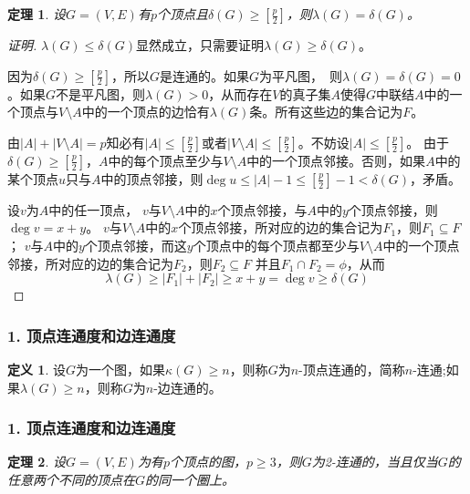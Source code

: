 \documentclass{beamer}
\newtheorem{Thm}{定理}[section]
\theoremstyle{definition}
\newtheorem{Def}{定义}[section]
\theoremstyle{example}
\begin{document}
\begin{CJK}{UTF8}{gbsn}
\begin{frame}
  \begin{Thm}
    设$G=(V,E)$有$p$个顶点且$\delta(G) \geq [ \frac{p}{2} ]$，则$\lambda(G) = \delta(G)$。
  \end{Thm}\small{\pause
  \begin{proof}[证明]
    \pause $\lambda(G) \leq \delta(G)$显然成立，\pause 只需要证明$\lambda(G) \geq \delta(G)$。

     

   \pause 因为$\delta(G) \geq [\frac{p}{2}]$，所以$G$是连通的。\pause 如果$G$为平凡图，　则$\lambda (G) = \delta(G) = 0$。如果$G$不是平凡图，则$\lambda(G) > 0$，从而存在$V$的真子集$A$使得$G$中联结$A$中的一个顶点与$V\setminus A$中的一个顶点的边恰有$\lambda(G)$条。\pause 所有这些边的集合记为$F$。

  \pause  由$|A| + |V\setminus A| = p$知必有$|A| \leq [\frac{p}{2}]$或者$|V\setminus A| \leq [\frac{p}{2}]$。\pause 不妨设$|A| \leq [\frac{p}{2}]$。 \pause 由于$\delta(G) \geq [\frac{p}{2}]$，$A$中的每个顶点至少与$V\setminus A$中的一个顶点邻接。\pause 否则，如果$A$中的某个顶点$u$只与$A$中的顶点邻接，则$\deg u \leq |A|-1 \leq [\frac{p}{2}] - 1 < \delta(G)$，矛盾。 

\pause    设$v$为$A$中的任一顶点， $v$与$V\setminus A$中的$x$个顶点邻接，与$A$中的$y$个顶点邻接，则$\deg v = x + y$。 \pause $v$与$V\setminus A$中的$x$个顶点邻接，所对应的边的集合记为$F_1$，则$F_1 \subseteq F$；
 \pause    $v$与$A$中的$y$个顶点邻接，而这$y$个顶点中的每个顶点都至少与$V\setminus A$中的一个顶点邻接，所对应的边的集合记为$F_2$，则$F_2 \subseteq F$ 并且$F_1 \cap F_2 = \phi$，\pause 从而
    \[\lambda(G) \geq |F_1| + |F_2| \geq x + y = \deg v \geq  \delta(G)\]
  \end{proof}}
\end{frame}


\begin{frame}
  \frametitle{1. 顶点连通度和边连通度}
  \begin{Def}
    设$G$为一个图，如果$\kappa (G) \geq n$，则称$G$为\alert{$n$-顶点连通}的，简称$n$-连通;如果$\lambda (G) \geq n$，则称$G$为\alert{$n$-边连通}的。
  \end{Def}
\end{frame}

\begin{frame}
  \frametitle{1. 顶点连通度和边连通度}
  \begin{Thm}
    设$G=(V,E)$为有$p$个顶点的图，$p \geq 3$，则$G$为2-连通的，当且仅当$G$的任意两个不同的顶点在$G$的同一个圈上。
  \end{Thm}
\end{frame}


\end{CJK}
\end{document}
